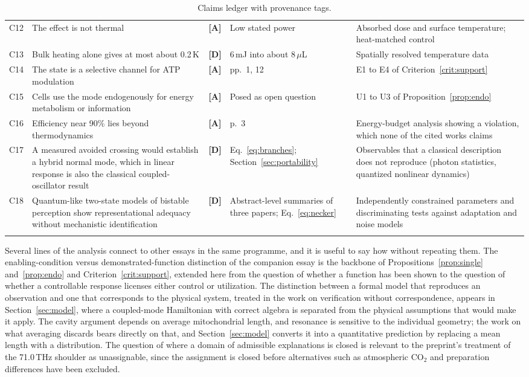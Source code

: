\documentclass[11pt]{article}
\newcommand{\stA}{\textbf{\textcolor{orange!70!black}{[A]}}}
\newcommand{\stD}{\textbf{\textcolor{green!40!black}{[D]}}}
\theoremstyle{plain}
\theoremstyle{definition}
\theoremstyle{remark}
\begin{document}
\begin{longtable}{@{}p{0.5cm}p{4.6cm}p{0.8cm}p{3.3cm}p{3.4cm}@{}}
C12 & The effect is not thermal & \stA & Low stated power & Absorbed dose and surface temperature; heat-matched control \\
C13 & Bulk heating alone gives at most about 0.2\,K & \stD & 6\,mJ into about 8\,$\mu$L & Spatially resolved temperature data \\
C14 & The state is a selective channel for ATP modulation & \stA & pp.~1, 12 & E1 to E4 of Criterion~\ref{crit:support} \\
C15 & Cells use the mode endogenously for energy metabolism or information & \stA & Posed as open question & U1 to U3 of Proposition~\ref{prop:endo} \\
C16 & Efficiency near 90\% lies beyond thermodynamics & \stA & p.~3 & Energy-budget analysis showing a violation, which none of the cited works claims \\
C17 & A measured avoided crossing would establish a hybrid normal mode, which in linear response is also the classical coupled-oscillator result & \stD & Eq.~\eqref{eq:branches}; Section~\ref{sec:portability} & Observables that a classical description does not reproduce (photon statistics, quantized nonlinear dynamics) \\
C18 & Quantum-like two-state models of bistable perception show representational adequacy without mechanistic identification & \stD & Abstract-level summaries of three papers; Eq.~\eqref{eq:necker} & Independently constrained parameters and discriminating tests against adaptation and noise models \\
\bottomrule
\caption{Claims ledger with provenance tags.}
\label{tab:ledger}
\end{longtable}
\endgroup

Several lines of the analysis connect to other essays in the same programme, and it is useful to say how without repeating them. The enabling-condition versus demonstrated-function distinction of the companion essay is the backbone of Propositions~\ref{prop:single} and~\ref{prop:endo} and Criterion~\ref{crit:support}, extended here from the question of whether a function has been shown to the question of whether a controllable response licenses either control or utilization. The distinction between a formal model that reproduces an observation and one that corresponds to the physical system, treated in the work on verification without correspondence, appears in Section~\ref{sec:model}, where a coupled-mode Hamiltonian with correct algebra is separated from the physical assumptions that would make it apply. The cavity argument depends on average mitochondrial length, and resonance is sensitive to the individual geometry; the work on what averaging discards bears directly on that, and Section~\ref{sec:model} converts it into a quantitative prediction by replacing a mean length with a distribution. The question of where a domain of admissible explanations is closed is relevant to the preprint's treatment of the 71.0\,THz shoulder as unassignable, since the assignment is closed before alternatives such as atmospheric CO$_2$ and preparation differences have been excluded.
\end{document}
